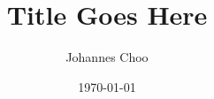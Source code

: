 \documentclass[a4paper, 12pt, extrafontsizes]{memoir}
\title{Title Goes Here}
\author{Johannes Choo}
\date{\today}
\begin{document}
\maketitle

\Blinddocument
\end{document}
